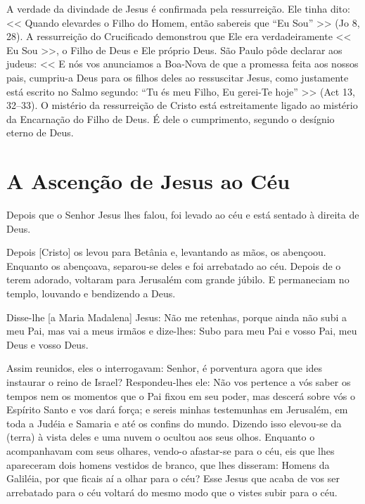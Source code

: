 \documentclass{rosario}
\begin{document}
A verdade da divindade de Jesus é confirmada pela ressurreição.
Ele tinha dito:
<< Quando elevardes o Filho do Homem, então sabereis que ``Eu Sou'' >> (Jo 8, 28).
A ressurreição do Crucificado demonstrou que Ele era verdadeiramente << Eu Sou >>, o Filho de Deus e Ele próprio Deus.
São Paulo pôde declarar aos judeus:
<< E nós vos anunciamos a Boa-Nova de que a promessa feita aos nossos pais, cumpriu-a Deus para os filhos deles ao ressuscitar Jesus, como justamente está escrito no Salmo segundo:
``Tu és meu Filho, Eu gerei-Te hoje'' >> (Act 13, 32--33).
O mistério da ressurreição de Cristo está estreitamente ligado ao mistério da Encarnação do Filho de Deus.
É dele o cumprimento, segundo o desígnio eterno de Deus.


\section{A Ascenção de Jesus ao Céu}



Depois que o Senhor Jesus lhes falou, foi levado ao céu e está sentado à direita de Deus.


Depois [Cristo] os levou para Betânia e, levantando as mãos, os abençoou.
Enquanto os abençoava, separou-se deles e foi arrebatado ao céu.
Depois de o terem adorado, voltaram para Jerusalém com grande júbilo.
E permaneciam no templo, louvando e bendizendo a Deus.


Disse-lhe [a Maria Madalena] Jesus: Não me retenhas, porque ainda não subi a meu Pai, mas vai a meus irmãos e dize-lhes: Subo para meu Pai e vosso Pai, meu Deus e vosso Deus.


Assim reunidos, eles o interrogavam:
Senhor, é porventura agora que ides instaurar o reino de Israel?
Respondeu-lhes ele:
Não vos pertence a vós saber os tempos nem os momentos que o Pai fixou em seu poder,
mas descerá sobre vós o Espírito Santo e vos dará força;
e sereis minhas testemunhas em Jerusalém, em toda a Judéia e Samaria e até os confins do mundo.
Dizendo isso elevou-se da (terra) à vista deles e uma nuvem o ocultou aos seus olhos.
Enquanto o acompanhavam com seus olhares, vendo-o afastar-se para o céu, eis que lhes apareceram dois homens vestidos de branco, que lhes disseram:
Homens da Galiléia, por que ficais aí a olhar para o céu? Esse Jesus que acaba de vos ser arrebatado para o céu voltará do mesmo modo que o vistes subir para o céu.
\end{document}
